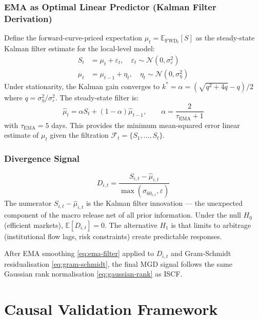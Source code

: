 \documentclass[11pt]{article}
\begin{document}
\subsubsection{EMA as Optimal Linear Predictor (Kalman Filter Derivation)}

Define the forward-curve-priced expectation $\mu_t = \mathbb{E}_{\text{FWD}_t}[S]$ as the steady-state Kalman filter estimate for the local-level model:
\begin{align}
S_t &= \mu_t + \varepsilon_t, \quad \varepsilon_t \sim \mathcal{N}(0, \sigma_\varepsilon^2) \label{eq:local-level-1} \\
\mu_t &= \mu_{t-1} + \eta_t, \quad \eta_t \sim \mathcal{N}(0, \sigma_\eta^2) \label{eq:local-level-2}
\end{align}
Under stationarity, the Kalman gain converges to $k^* = \alpha = (\sqrt{q^2+4q} - q)/2$ where $q = \sigma_\eta^2/\sigma_\varepsilon^2$. The steady-state filter is:
\begin{equation}
\hat{\mu}_t = \alpha S_t + (1-\alpha)\hat{\mu}_{t-1}, \qquad \alpha = \frac{2}{\tau_{\text{EMA}}+1}
\label{eq:ema-filter}
\end{equation}
with $\tau_{\text{EMA}} = 5$ days. This provides the minimum mean-squared error linear estimate of $\mu_t$ given the filtration $\mathcal{F}_t = \{S_1, \ldots, S_t\}$.

\subsubsection{Divergence Signal}

\begin{equation}
D_{i,t} = \frac{S_{i,t} - \hat{\mu}_{i,t}}{\max(\sigma_{60_{i,t}}, \varepsilon)}
\label{eq:divergence}
\end{equation}
The numerator $S_{i,t} - \hat{\mu}_{i,t}$ is the Kalman filter innovation --- the unexpected component of the macro release net of all prior information. Under the null $H_0$ (efficient markets), $\mathbb{E}[D_{i,t}] = 0$. The alternative $H_1$ is that limits to arbitrage (institutional flow lags, risk constraints) create predictable responses.

After EMA smoothing \eqref{eq:ema-filter} applied to $D_{i,t}$ and Gram-Schmidt residualisation \eqref{eq:gram-schmidt}, the final MGD signal follows the same Gaussian rank normalisation \eqref{eq:gaussian-rank} as ISCF.

\section{Causal Validation Framework}
\end{document}
